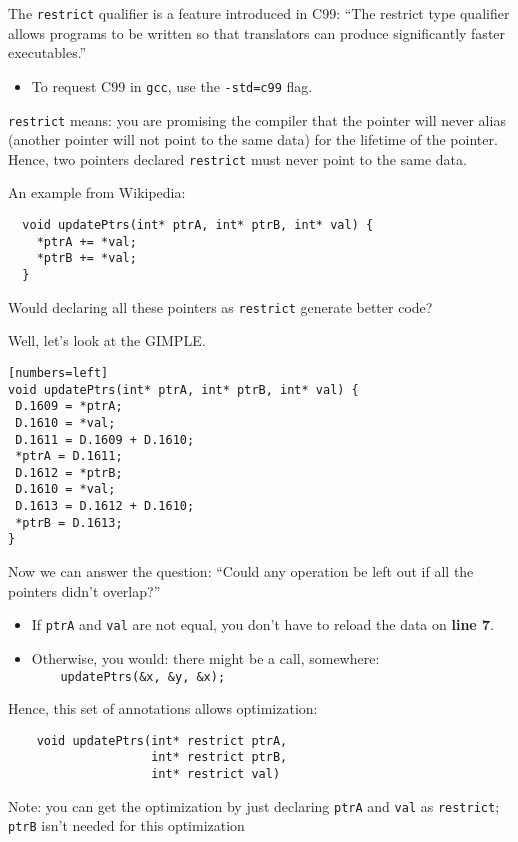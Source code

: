 The {\tt restrict} qualifier is a feature introduced in C99: ``The
restrict type qualifier allows programs to be written so that
translators can produce significantly faster executables.''
  \begin{itemize}
    \item To request C99 in {\tt gcc}, use the {\tt -std=c99} flag.
  \end{itemize}

{\tt restrict} means: you are promising the
compiler that the pointer will never alias (another pointer will not
point to the same data) for the lifetime of the pointer.  Hence, two
pointers declared {\tt restrict} must never point to the same data.

An example from Wikipedia:
\begin{verbatim}
  void updatePtrs(int* ptrA, int* ptrB, int* val) {
    *ptrA += *val;
    *ptrB += *val;
  }
\end{verbatim}
Would declaring all these pointers as {\tt restrict} generate better code?

Well, let's look at the GIMPLE.

\begin{verbatim}[numbers=left]
void updatePtrs(int* ptrA, int* ptrB, int* val) {
 D.1609 = *ptrA;
 D.1610 = *val;
 D.1611 = D.1609 + D.1610;
 *ptrA = D.1611;
 D.1612 = *ptrB;
 D.1610 = *val;
 D.1613 = D.1612 + D.1610;
 *ptrB = D.1613;
}
\end{verbatim}

Now we can answer the question: ``Could any operation be left out if
all the pointers didn't overlap?''

\begin{itemize}
\item If {\tt ptrA} and {\tt val} are not equal, you don't have to
      reload the data on {\bf line 7}.
\item Otherwise, you would: there might be a call, somewhere:\\\verb+    updatePtrs(&x, &y, &x);+
\end{itemize}

Hence, this set of annotations allows optimization:
\begin{verbatim}
    void updatePtrs(int* restrict ptrA, 
                    int* restrict ptrB,
                    int* restrict val)
\end{verbatim}
Note: you can get the optimization by just declaring {\tt ptrA} and
      {\tt val} as {\tt restrict}; {\tt ptrB} isn't needed for this optimization


